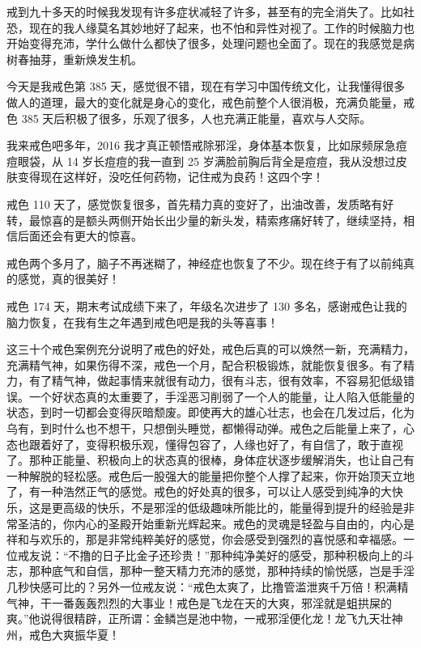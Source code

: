 \begin{case}[戒色]
    戒到九十多天的时候我发现有许多症状减轻了许多，甚至有的完全消失了。比如社恐，现在的我人缘莫名其妙地好了起来，也不怕和异性对视了。工作的时候脑力也开始变得充沛，学什么做什么都快了很多，处理问题也全面了。现在的我感觉是病树春抽芽，重新焕发生机。
\end{case}

\begin{case}[戒色]
    今天是我戒色第 385 天，感觉很不错，现在有学习中国传统文化，让我懂得很多做人的道理，最大的变化就是身心的变化，戒色前整个人很消极，充满负能量，戒色 385 天后积极了很多，乐观了很多，人也充满正能量，喜欢与人交际。
\end{case}

\begin{case}[戒色]
    我来戒色吧多年，2016 我才真正顿悟戒除邪淫，身体基本恢复，比如尿频尿急痘痘眼袋，从 14 岁长痘痘的我一直到 25 岁满脸前胸后背全是痘痘，我从没想过皮肤变得现在这样好，没吃任何药物，记住戒为良药！这四个字！
\end{case}

\begin{case}[戒色]
    戒色 110 天了，感觉恢复很多，首先精力真的变好了，出油改善，发质略有好转，最惊喜的是额头两侧开始长出少量的新头发，精索疼痛好转了，继续坚持，相信后面还会有更大的惊喜。
\end{case}

\begin{case}[戒色]
    戒色两个多月了，脑子不再迷糊了，神经症也恢复了不少。现在终于有了以前纯真的感觉，真的很美好！
\end{case}

\begin{case}[戒色]
    戒色 174 天，期末考试成绩下来了，年级名次进步了 130 多名，感谢戒色让我的脑力恢复，在我有生之年遇到戒色吧是我的头等喜事！
\end{case}

这三十个戒色案例充分说明了戒色的好处，戒色后真的可以焕然一新，充满精力，充满精气神，如果伤得不深，戒色一个月，配合积极锻炼，就能恢复很多。有了精力，有了精气神，做起事情来就很有动力，很有斗志，很有效率，不容易犯低级错误。一个好状态真的太重要了，手淫恶习削弱了一个人的能量，让人陷入低能量的状态，到时一切都会变得灰暗颓废。即使再大的雄心壮志，也会在几发过后，化为乌有，到时什么也不想干，只想倒头睡觉，都懒得动弹。戒色之后能量上来了，心态也跟着好了，变得积极乐观，懂得包容了，人缘也好了，有自信了，敢于直视了。那种正能量、积极向上的状态真的很棒，身体症状逐步缓解消失，也让自己有一种解脱的轻松感。戒色后一股强大的能量把你整个人撑了起来，你开始顶天立地了，有一种浩然正气的感觉。戒色的好处真的很多，可以让人感受到纯净的大快乐，这是更高级的快乐，不是邪淫的低级趣味所能比的，能量得到提升的经验是非常圣洁的，你内心的圣殿开始重新光辉起来。戒色的灵魂是轻盈与自由的，内心是祥和与欢乐的，那是非常纯粹美好的感觉，你会感受到强烈的喜悦感和幸福感。一位戒友说：“不撸的日子比金子还珍贵！”那种纯净美好的感受，那种积极向上的斗志，那种底气和自信，那种一整天精力充沛的感觉，那种持续的愉悦感，岂是手淫几秒快感可比的？另外一位戒友说：“戒色太爽了，比撸管滥泄爽千万倍！积满精气神，干一番轰轰烈烈的大事业！戒色是飞龙在天的大爽，邪淫就是蛆拱屎的爽。”他说得很精辟，正所谓：金鳞岂是池中物，一戒邪淫便化龙！龙飞九天壮神州，戒色大爽振华夏！

